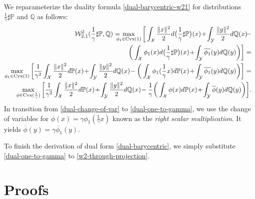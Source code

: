 \documentclass{article} %
\begin{document}
We reparameterize the duality formula \eqref{dual-barycentric-w21} for distributions $\frac{1}{\gamma} \sharp\mathbb{P}$ and $\mathbb{Q}$ as follows:
\begin{eqnarray}
    \mathcal{W}_{2,1}^{2}(\frac{1}{\gamma} \sharp\mathbb{P},\mathbb{Q})=\hspace{-3mm}\max_{\phi_{1}\in \text{\normalfont Cvx}(1)}\bigg[\int_{\mathcal{X}} \frac{\|x\|^{2}}{2}d\big(\frac{1}{\gamma} \sharp\mathbb{P}\big)(x)\!+\!\int_{\mathcal{Y}}\frac{\|y\|^{2}}{2}d\mathbb{Q}(x)\!-
    \nonumber
    \\
    \bigg(\int_{\mathcal{X}}\phi_{1}(x)d\big(\frac{1}{\gamma} \sharp\mathbb{P}\big)(x)\!+\!\int_{\mathcal{Y}}\overline{\phi_{1}}(y)d\mathbb{Q}(y)\bigg)\bigg]=
    \nonumber
    \\
    \max_{\phi_{1}\in \text{\normalfont Cvx}(1)}\bigg[\frac{1}{\gamma^{2}}\int_{\mathcal{X}} \frac{\|x\|^{2}}{2}d\mathbb{P}(x)\!+\!\int_{\mathcal{Y}}\frac{\|y\|^{2}}{2}d\mathbb{Q}(x)\!-
    \bigg(\int_{\mathcal{X}}\phi_{1}(\frac{1}{\gamma} x)d\mathbb{P}(x)\!+\!\int_{\mathcal{Y}}\overline{\phi_{1}}(y)d\mathbb{Q}(y)\bigg)\bigg]=
    \label{dual-change-of-var}
    \\
    \max_{\phi\in \text{\normalfont Cvx}(\frac{1}{\gamma} )}\bigg[\frac{1}{\gamma^{2}}\int_{\mathcal{X}} \frac{\|x\|^{2}}{2}d\mathbb{P}(x)\!+\!\int_{\mathcal{Y}}\frac{\|y\|^{2}}{2}d\mathbb{Q}(x)\!-
    \frac{1}{\gamma}\bigg(\int_{\mathcal{X}}\phi(x)d\mathbb{P}(x)\!+\!\int_{\mathcal{Y}}\overline{\phi}(y)d\mathbb{Q}(y)\bigg)\bigg].
    \label{dual-one-to-gamma}
\end{eqnarray}
In transition from \eqref{dual-change-of-var} to \eqref{dual-one-to-gamma}, we use the change of variables for $\phi(x)=\gamma\phi_{1}(\frac{1}{\gamma} x)$ known as the \textit{right scalar multiplication}. It yields $\overline{\phi}(y)=\gamma\overline{\phi_{1}}(y)$. 

To finish the derivation of dual form \eqref{dual-barycentric}, we simply substitute \eqref{dual-one-to-gamma} to
\eqref{w2-through-projection}.
\section{Proofs}
\label{sec-proofs}
\end{document}
